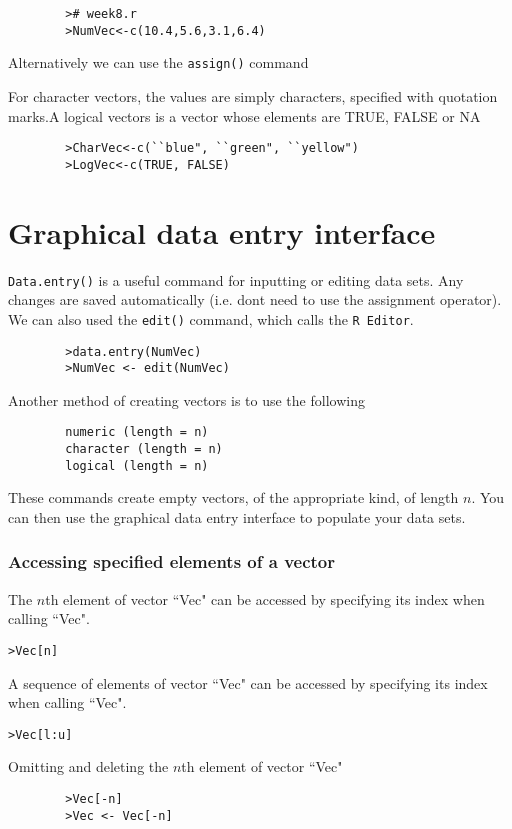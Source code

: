 \documentclass[a4paper,12pt]{article}
\begin{document}
\begin{itemize}
		\begin{verbatim}
		># week8.r
		>NumVec<-c(10.4,5.6,3.1,6.4)
		\end{verbatim}
		
		Alternatively we can use the \texttt{assign()} command
		
		For character vectors, the values are simply characters, specified with
		quotation marks.A logical vectors is a vector whose elements are TRUE, FALSE or NA
		
		\begin{verbatim}
		>CharVec<-c(``blue", ``green", ``yellow")
		>LogVec<-c(TRUE, FALSE)
		\end{verbatim}
		
		\section{Graphical data entry interface}
		
		\texttt{Data.entry()} is a useful  command for inputting or editing data sets. Any
		changes are saved automatically (i.e. dont need to use the assignment
		operator). We can also used the \texttt{edit()} command, which calls the \texttt{R Editor}.
		
		\begin{verbatim}
		>data.entry(NumVec)
		>NumVec <- edit(NumVec)
		\end{verbatim}
		
		Another method of creating vectors is to use the following
		\begin{verbatim}
		numeric (length = n)
		character (length = n)
		logical (length = n)
		\end{verbatim}
		These commands create empty vectors, of the appropriate kind, of length $n$. You can then use the graphical data entry interface to populate your data sets.
		
		\subsubsection{Accessing specified elements of a vector}
		
		The $n$th element of vector ``Vec" can be accessed by specifying its index when
		calling ``Vec".
		\begin{verbatim}>Vec[n]
		\end{verbatim}
		A sequence of  elements of vector ``Vec" can be accessed by specifying its index
		when calling ``Vec".
		\begin{verbatim}>Vec[l:u]
		\end{verbatim}
		Omitting and deleting the $n$th element of vector ``Vec"
		\begin{verbatim}
		>Vec[-n]
		>Vec <- Vec[-n]
		\end{verbatim}
		

\end{itemize}
\end{document}
